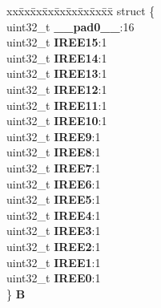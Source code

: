 \begin{DoxyCompactItemize}
\begin{tabbing}
\end{tabbing}\item 
\mbox{\label{unionSIU__tag_1_1SIU__IREER__tag_a8ed60e851db598ec3d9fd209712a17d3}} 
\begin{tabbing}
xx\=xx\=xx\=xx\=xx\=xx\=xx\=xx\=xx\=\kill
struct \{\\
\>uint32\_t {\bfseries \_\_pad0\_\_}:16\\
\>uint32\_t {\bfseries IREE15}:1\\
\>uint32\_t {\bfseries IREE14}:1\\
\>uint32\_t {\bfseries IREE13}:1\\
\>uint32\_t {\bfseries IREE12}:1\\
\>uint32\_t {\bfseries IREE11}:1\\
\>uint32\_t {\bfseries IREE10}:1\\
\>uint32\_t {\bfseries IREE9}:1\\
\>uint32\_t {\bfseries IREE8}:1\\
\>uint32\_t {\bfseries IREE7}:1\\
\>uint32\_t {\bfseries IREE6}:1\\
\>uint32\_t {\bfseries IREE5}:1\\
\>uint32\_t {\bfseries IREE4}:1\\
\>uint32\_t {\bfseries IREE3}:1\\
\>uint32\_t {\bfseries IREE2}:1\\
\>uint32\_t {\bfseries IREE1}:1\\
\>uint32\_t {\bfseries IREE0}:1\\
\} {\bfseries B}\\


\end{tabbing}
\end{DoxyCompactItemize}

